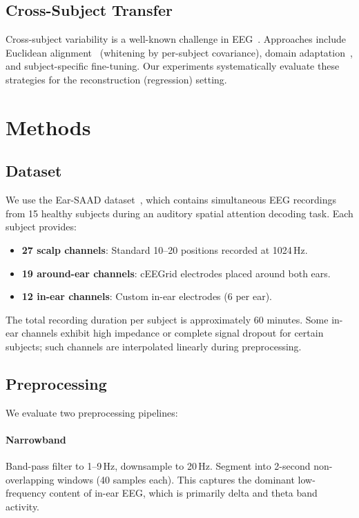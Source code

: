 \documentclass[conference]{IEEEtran}
\begin{document}
\subsection{Cross-Subject Transfer}

Cross-subject variability is a well-known challenge in EEG~\cite{lotte2018review}. Approaches include Euclidean alignment~\cite{he2020euclidean} (whitening by per-subject covariance), domain adaptation~\cite{ganin2016domain}, and subject-specific fine-tuning. Our experiments systematically evaluate these strategies for the reconstruction (regression) setting.

\section{Methods}
\label{sec:methods}

\subsection{Dataset}

We use the Ear-SAAD dataset~\cite{ear_saad}, which contains simultaneous EEG recordings from 15 healthy subjects during an auditory spatial attention decoding task. Each subject provides:

\begin{itemize}
    \item \textbf{27 scalp channels}: Standard 10--20 positions recorded at 1024\,Hz.
    \item \textbf{19 around-ear channels}: cEEGrid electrodes placed around both ears.
    \item \textbf{12 in-ear channels}: Custom in-ear electrodes (6 per ear).
\end{itemize}

The total recording duration per subject is approximately 60 minutes. Some in-ear channels exhibit high impedance or complete signal dropout for certain subjects; such channels are interpolated linearly during preprocessing.

\subsection{Preprocessing}

We evaluate two preprocessing pipelines:

\paragraph{Narrowband} Band-pass filter to 1--9\,Hz, downsample to 20\,Hz. Segment into 2-second non-overlapping windows (40 samples each). This captures the dominant low-frequency content of in-ear EEG, which is primarily delta and theta band activity.
\end{document}
